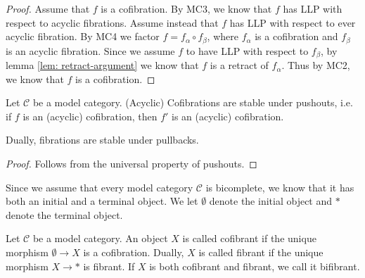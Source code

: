 \documentclass[../thesis.tex]{subfiles}
\begin{document}
            \begin{proof}
            Assume that $f$ is a cofibration. By MC3, we know that $f$ has LLP with respect to acyclic fibrations. Assume instead that $f$ has LLP with respect to ever acyclic fibration. By MC4 we factor $f = f_\alpha\circ f_\beta$, where $f_\alpha$ is a cofibration and $f_\beta$ is an acyclic fibration. Since we assume $f$ to have LLP with respect to $f_\beta$, by lemma \ref{lem: retract-argument} we know that $f$ is a retract of $f_\alpha$. Thus by MC2, we know that $f$ is a cofibration. 
            \end{proof}

            \begin{corollary}\label{cor: stable-cofib-base-change}
                Let $\mathcal{C}$ be a model category. (Acyclic) Cofibrations are stable under pushouts, i.e. if $f$ is an (acyclic) cofibration, then $f'$ is an (acyclic) cofibration.
                \begin{center}
                \end{center}
                Dually, fibrations are stable under pullbacks.
            \end{corollary}

            \begin{proof}
                Follows from the universal property of pushouts.   
            \end{proof}

            Since we assume that every model category $\mathcal{C}$ is bicomplete, we know that it has both an initial and a terminal object. We let $\emptyset$ denote the initial object and $*$ denote the terminal object. 

            \begin{definition}
                Let $\mathcal{C}$ be a model category. An object $X$ is called cofibrant if the unique morphism $\emptyset \rightarrow X$ is a cofibration. Dually, $X$ is called fibrant if the unique morphism $X \rightarrow *$ is fibrant. If $X$ is both cofibrant and fibrant, we call it bifibrant.
            \end{definition}
\end{document}
